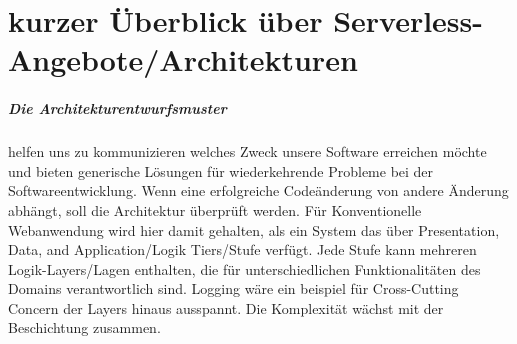 \documentclass[
12pt,
english,
ngerman,
headsepline,
twoside,
openright,
numbers=noenddot,version=first
]{scrreprt}
\begin{document}














\chapter{kurzer Überblick über Serverless-Angebote/Architekturen}

\paragraph{Die Architekturentwurfsmuster} helfen uns zu kommunizieren welches Zweck unsere Software erreichen möchte und bieten generische Lösungen für wiederkehrende Probleme bei der Softwareentwicklung.
Wenn eine erfolgreiche Codeänderung von andere Änderung abhängt, soll die Architektur überprüft werden.
Für Konventionelle Webanwendung wird hier damit gehalten, als ein System das über Presentation, Data, and Application/Logik Tiers/Stufe verfügt. Jede Stufe kann mehreren Logik-Layers/Lagen enthalten, die für unterschiedlichen Funktionalitäten des Domains verantwortlich sind. Logging wäre ein beispiel für Cross-Cutting Concern der Layers hinaus ausspannt. Die Komplexität wächst mit der Beschichtung zusammen.\\
\end{document}
